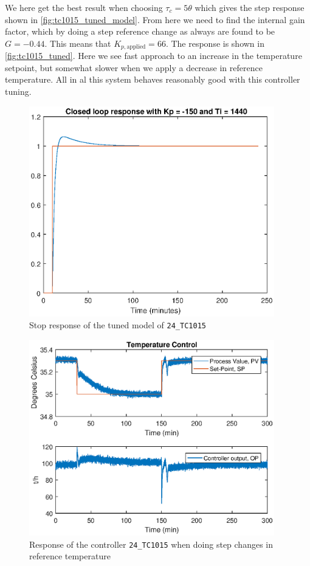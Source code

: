 We here get the best result when choosing $\tau_c = 5\theta$ which gives the step response shown in \autoref{fig:tc1015_tuned_model}. From here we need to find the internal gain factor, which by doing a step reference change as always are found to be $G = -0.44$. This means that $K_{p,\text{applied}} = 66$. The response is shown in \autoref{fig:tc1015_tuned}. Here we see fast approach to an increase in the temperature setpoint, but somewhat slower when we apply a decrease in reference temperature. All in al this system behaves reasonably good with this controller tuning.

\begin{figure}[ht!]
	\centering
	\includegraphics[width=0.95\textwidth]{fig/identification/tc1015_tuned_model.eps}
	\caption{Stop response of the tuned model of \texttt{24\_TC1015}}
	\label{fig:tc1015_tuned_model}
\end{figure}
\begin{figure}[ht!]
	\centering
	\includegraphics[width=0.95\textwidth]{fig/identification/tc1015_tuned_kspice.eps}
	\caption{Response of the controller \texttt{24\_TC1015} when doing step changes in reference temperature}
	\label{fig:tc1015_tuned}
\end{figure}